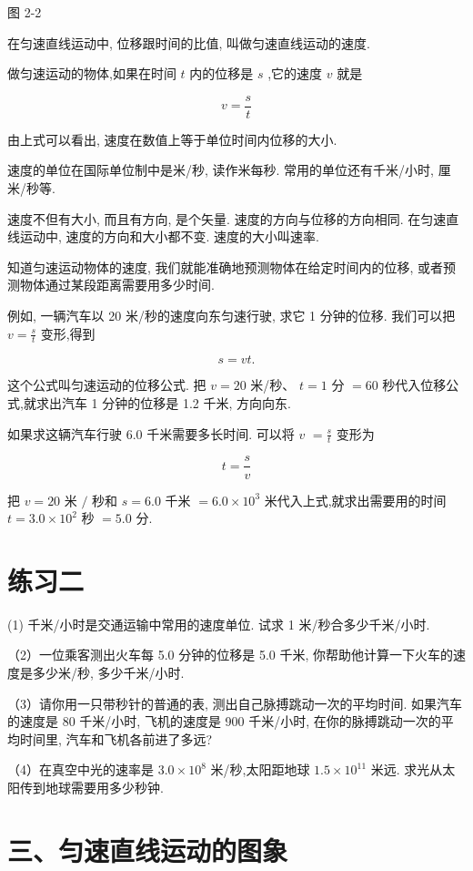 \documentclass[10pt]{article}
\begin{document}
图 2-2

在匀速直线运动中, 位移跟时间的比值, 叫做匀速直线运动的速度.

做匀速运动的物体,如果在时间 \(t\) 内的位移是 \(s\) ,它的速度 \(v\) 就是

\[
v = \frac{s}{t}
\]

由上式可以看出, 速度在数值上等于单位时间内位移的大小.

速度的单位在国际单位制中是米/秒, 读作米每秒. 常用的单位还有千米/小时, 厘米/秒等.

速度不但有大小, 而且有方向, 是个矢量. 速度的方向与位移的方向相同. 在匀速直线运动中, 速度的方向和大小都不变. 速度的大小叫速率.

知道匀速运动物体的速度, 我们就能准确地预测物体在给定时间内的位移, 或者预测物体通过某段距离需要用多少时间.

例如, 一辆汽车以 20 米/秒的速度向东匀速行驶, 求它 1 分钟的位移. 我们可以把 \(v = \frac{s}{t}\) 变形,得到

\[
s = {vt}\text{.}
\]

这个公式叫匀速运动的位移公式. 把 \(v = {20}\) 米/秒、 \(t = 1\) 分 \(= {60}\) 秒代入位移公式,就求出汽车 1 分钟的位移是 1.2 千米, 方向向东.

如果求这辆汽车行驶 6.0 千米需要多长时间. 可以将 \(v\) \(= \frac{s}{t}\) 变形为

\[
t = \frac{s}{v}
\]

把 \(v = {20}\) 米 \(/\) 秒和 \(s = {6.0}\) 千米 \(= {6.0} \times {10}^{3}\) 米代入上式,就求出需要用的时间 \(t = {3.0} \times {10}^{2}\) 秒 \(= {5.0}\) 分.

\section*{练习二}

(1) 千米/小时是交通运输中常用的速度单位. 试求 1 米/秒合多少千米/小时.

（2）一位乘客测出火车每 5.0 分钟的位移是 5.0 千米, 你帮助他计算一下火车的速度是多少米/秒, 多少千米/小时.

（3）请你用一只带秒针的普通的表, 测出自己脉搏跳动一次的平均时间. 如果汽车的速度是 80 千米/小时, 飞机的速度是 900 千米/小时, 在你的脉搏跳动一次的平均时间里, 汽车和飞机各前进了多远?

（4）在真空中光的速率是 \({3.0} \times {10}^{8}\) 米/秒,太阳距地球 \({1.5} \times {10}^{11}\) 米远. 求光从太阳传到地球需要用多少秒钟.

\section*{三、匀速直线运动的图象}
\end{document}
